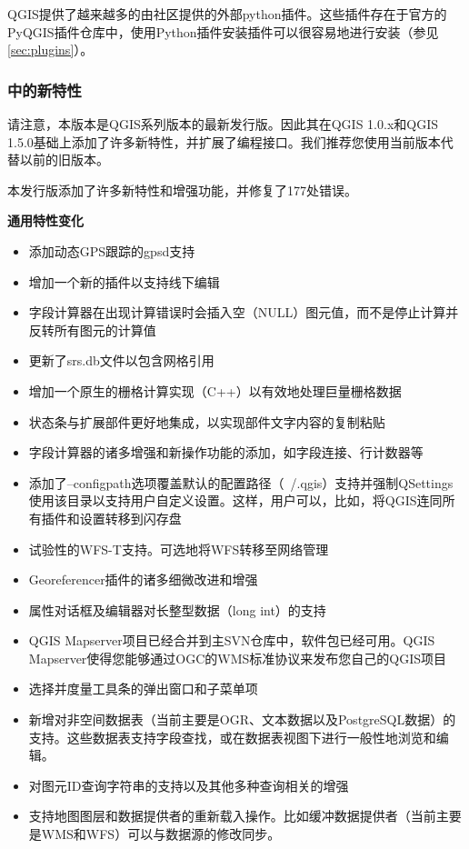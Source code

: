 QGIS提供了越来越多的由社区提供的外部python插件。这些插件存在于官方的PyQGIS插件仓库中，使用Python插件安装插件可以很容易地进行安装（参见\ref{sec:plugins}）。

\subsubsection{\qg \CURRENT 中的新特性} 

请注意，本版本是QGIS系列版本的最新发行版。因此其在QGIS 1.0.x和QGIS 1.5.0基础上添加了许多新特性，并扩展了编程接口。我们推荐您使用当前版本代替以前的旧版本。

本发行版添加了许多新特性和增强功能，并修复了177处错误。

\textbf{通用特性变化}

\begin{itemize}[label=--]
\item 添加动态GPS跟踪的gpsd支持
\item 增加一个新的插件以支持线下编辑
\item 字段计算器在出现计算错误时会插入空（NULL）图元值，而不是停止计算并反转所有图元的计算值
\item 更新了srs.db文件以包含网格引用
\item 增加一个原生的栅格计算实现（C++）以有效地处理巨量栅格数据
\item 状态条与扩展部件更好地集成，以实现部件文字内容的复制粘贴
\item 字段计算器的诸多增强和新操作功能的添加，如字段连接、行计数器等
\item 添加了--configpath选项覆盖默认的配置路径（~/.qgis）支持并强制QSettings使用该目录以支持用户自定义设置。这样，用户可以，比如，将QGIS连同所有插件和设置转移到闪存盘
\item 试验性的WFS-T支持。可选地将WFS转移至网络管理
\item Georeferencer插件的诸多细微改进和增强
\item 属性对话框及编辑器对长整型数据（long int）的支持
\item QGIS Mapserver项目已经合并到主SVN仓库中，软件包已经可用。QGIS Mapserver使得您能够通过OGC的WMS标准协议来发布您自己的QGIS项目
\item 选择并度量工具条的弹出窗口和子菜单项
\item 新增对非空间数据表（当前主要是OGR、文本数据以及PostgreSQL数据）的支持。这些数据表支持字段查找，或在数据表视图下进行一般性地浏览和编辑。
\item 对图元ID查询字符串的支持以及其他多种查询相关的增强
\item 支持地图图层和数据提供者的重新载入操作。比如缓冲数据提供者（当前主要是WMS和WFS）可以与数据源的修改同步。
\end{itemize}

